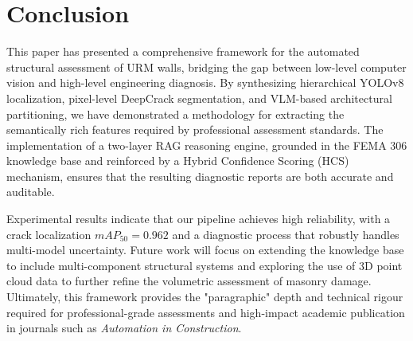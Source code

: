 \documentclass[final,5p,times]{elsarticle}
\begin{document}
\section{Conclusion}
\label{sec:conclusion}
\begin{sloppypar}
This paper has presented a comprehensive framework for the automated structural assessment of URM walls, bridging the gap between low-level computer vision and high-level engineering diagnosis. By synthesizing hierarchical YOLOv8 localization, pixel-level DeepCrack segmentation, and VLM-based architectural partitioning, we have demonstrated a methodology for extracting the semantically rich features required by professional assessment standards. The implementation of a two-layer RAG reasoning engine, grounded in the FEMA 306 knowledge base and reinforced by a Hybrid Confidence Scoring (HCS) mechanism, ensures that the resulting diagnostic reports are both accurate and auditable.
\end{sloppypar}

\begin{sloppypar}
Experimental results indicate that our pipeline achieves high reliability, with a crack localization $mAP_{50} = 0.962$ and a diagnostic process that robustly handles multi-model uncertainty. Future work will focus on extending the knowledge base to include multi-component structural systems and exploring the use of 3D point cloud data to further refine the volumetric assessment of masonry damage. Ultimately, this framework provides the "paragraphic" depth and technical rigour required for professional-grade assessments and high-impact academic publication in journals such as \textit{Automation in Construction}.
\end{sloppypar}



\end{document}
